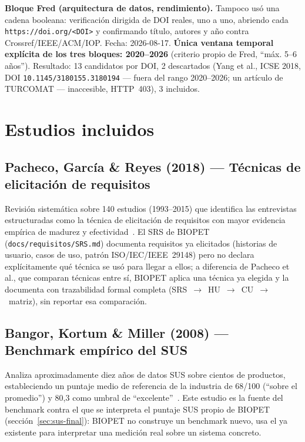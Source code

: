 \textbf{Bloque Fred (arquitectura de datos, rendimiento).} Tampoco usó
una cadena booleana: verificación dirigida de DOI reales, uno a uno,
abriendo cada \texttt{https://doi.org/<DOI>} y confirmando título,
autores y año contra Crossref/IEEE/ACM/IOP. Fecha: 2026-08-17.
\textbf{Única ventana temporal explícita de los tres bloques: 2020--2026}
(criterio propio de Fred, ``máx. 5--6 años''). Resultado: 13 candidatos
por DOI, 2 descartados (Yang et al., ICSE 2018, DOI
\texttt{10.1145/3180155.3180194} --- fuera del rango 2020--2026; un
artículo de TURCOMAT --- inaccesible, HTTP~403), 3 incluidos.

\section{Estudios incluidos}

\subsection{Pacheco, Garc\'ia \& Reyes (2018) --- T\'ecnicas de elicitaci\'on de requisitos}
Revisi\'on sistem\'atica sobre 140 estudios (1993--2015) que identifica las
entrevistas estructuradas como la t\'ecnica de elicitaci\'on de requisitos
con mayor evidencia emp\'irica de madurez y efectividad~\cite{pacheco2018requirements}.
El SRS de BIOPET (\texttt{docs/requisitos/SRS.md}) documenta requisitos ya
elicitados (historias de usuario, casos de uso, patr\'on ISO/IEC/IEEE~29148)
pero no declara expl\'icitamente qu\'e t\'ecnica se us\'o para llegar a
ellos; a diferencia de Pacheco et al., que comparan t\'ecnicas entre s\'i,
BIOPET aplica una t\'ecnica ya elegida y la documenta con trazabilidad
formal completa (SRS~$\to$~HU~$\to$~CU~$\to$~matriz), sin reportar esa
comparaci\'on.

\subsection{Bangor, Kortum \& Miller (2008) --- Benchmark emp\'irico del SUS}
Analiza aproximadamente diez a\~nos de datos SUS sobre cientos de
productos, estableciendo un puntaje medio de referencia de la industria de
68/100 (``sobre el promedio'') y 80{,}3 como umbral de
``excelente''~\cite{bangor2008sus}. Este estudio es la fuente del
benchmark contra el que se interpreta el puntaje SUS propio de BIOPET
(secci\'on~\ref{sec:sus-final}): BIOPET no construye un benchmark nuevo,
usa el ya existente para interpretar una medici\'on real sobre un sistema
concreto.

